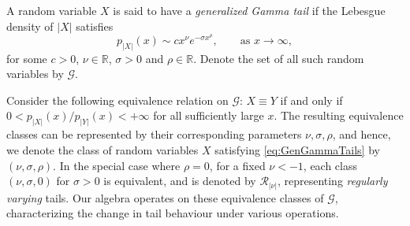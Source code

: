 \documentclass[../thesis.tex]{subfiles}
\begin{document}
\begin{definition}\label{def:gg_tail}
  A random variable $X$ is said to have a \emph{generalized Gamma tail} if the Lebesgue density of $|X|$ satisfies
  \begin{equation}
    \label{eq:GenGammaTails}
    p_{|X|}(x) \sim c x^\nu e^{-\sigma x^\rho}, \qquad \text{as } x \to \infty,
  \end{equation}
  for some $c > 0$, $\nu \in \mathbb{R}$, $\sigma > 0$ and $\rho \in \mathbb{R}$. Denote the set of all such random variables by $\mathcal{G}$.
\end{definition}
Consider the following equivalence relation on $\mathcal{G}$: $X \equiv Y$ if and only if $0 < p_{|X|}(x) / p_{|Y|}(x) < +\infty$ for all sufficiently large $x$. The resulting equivalence classes can be represented by their corresponding parameters $\nu, \sigma, \rho$, and hence, we denote the class of random variables $X$ satisfying \cref{eq:GenGammaTails} by $(\nu,\sigma,\rho)$. In the special case where $\rho = 0$, for a fixed $\nu < -1$, each class $(\nu,\sigma,0)$ for $\sigma > 0$ is equivalent, and is denoted by $\mathcal{R}_{|\nu|}$, representing \emph{regularly varying} tails. Our algebra operates on these equivalence classes of $\mathcal{G}$, characterizing the change in tail behaviour under various operations.
\end{document}
